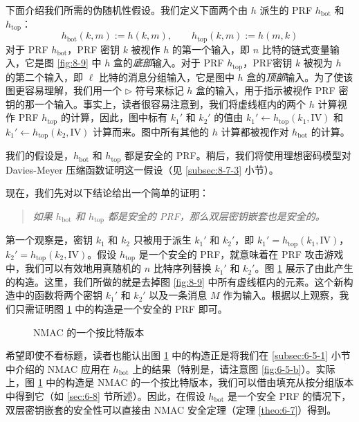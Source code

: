 下面介绍我们所需的伪随机性假设。我们定义下面两个由 $h$ 派生的 PRF $h_\mathrm{bot}$ 和 $h_\mathrm{top}$：
\begin{equation}\label{eq:8-6}
h_\mathrm{bot}(k,m):=h(k,m),
\qquad
h_\mathrm{top}(k,m):=h(m,k)
\end{equation}
对于 PRF $h_\mathrm{bot}$，PRF 密钥 $k$ 被视作 $h$ 的第一个输入，即 $n$ 比特的链式变量输入，它是图 \ref{fig:8-9} 中 $h$ 盒的\emph{底部}输入。对于 PRF $h_\mathrm{top}$，PRF密钥 $k$ 被视为 $h$ 的第二个输入，即 $\ell$ 比特的消息分组输入，它是图中 $h$ 盒的\emph{顶部}输入。为了使该图更容易理解，我们用一个 $\triangleright$ 符号来标记 $h$ 盒的输入，用于指示被视作 PRF 密钥的那一个输入。事实上，读者很容易注意到，我们将虚线框内的两个 $h$ 计算视作 PRF $h_\mathrm{top}$ 的计算，因此，图中标有 $k_1'$ 和 $k_2'$ 的值由 $k_1'\leftarrow h_\mathrm{top}(k_1,\mathrm{IV})$ 和 $k_1'\leftarrow h_\mathrm{top}(k_2,\mathrm{IV})$ 计算而来。图中所有其他的 $h$ 计算都被视作对 $h_\mathrm{bot}$ 的计算。

我们的假设是，$h_\mathrm{bot}$ 和 $h_\mathrm{top}$ 都是安全的 PRF。稍后，我们将使用理想密码模型对 Davies-Meyer 压缩函数证明这一假设（见 \ref{subsec:8-7-3} 小节）。

现在，我们先对以下结论给出一个简单的证明：
\begin{quote}
\emph{如果 $h_\mathrm{bot}$ 和 $h_\mathrm{top}$ 都是安全的 PRF，那么双层密钥嵌套也是安全的。}
\end{quote}

第一个观察是，密钥 $k_1$ 和 $k_2$ 只被用于派生 $k_1'$ 和 $k_2'$，即 $k_1'=h_\mathrm{top}(k_1,\mathrm{IV})$，$k_2'=h_\mathrm{top}(k_2,\mathrm{IV})$。假设 $h_\mathrm{top}$ 是一个安全的 PRF，就意味着在 PRF 攻击游戏中，我们可以有效地用真随机的 $n$ 比特序列替换 $k_1'$ 和 $k_2'$。图 \ref{fig:8-10} 展示了由此产生的构造。这里，我们所做的就是去掉图 \ref{fig:8-9} 中所有虚线框内的元素。这个新构造中的函数将两个密钥 $k_1'$ 和 $k_2'$ 以及一条消息 $M$ 作为输入。根据以上观察，我们只需证明图 \ref{fig:8-10} 中的构造是一个安全的 PRF 即可。

\begin{figure}
	\centering
	
	\caption{NMAC 的一个按比特版本}
	\label{fig:8-10}
\end{figure}

希望即使不看标题，读者也能认出图 \ref{fig:8-10} 中的构造正是将我们在 \ref{subsec:6-5-1} 小节中介绍的 NMAC 应用在 $h_\mathrm{bot}$ 上的结果（特别是，请注意图 \ref{fig:6-5-b}）。实际上，图 \ref{fig:8-10} 中的构造是 NMAC 的一个按比特版本，我们可以借由填充从按分组版本中得到它（如 \ref{sec:6-8} 节所述）。因此，在假设 $h_\mathrm{bot}$ 是一个安全 PRF 的情况下，双层密钥嵌套的安全性可以直接由 NMAC 安全定理（定理 \ref{theo:6-7}）得到。

